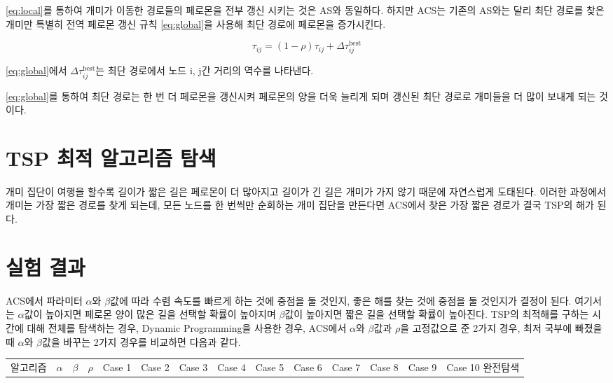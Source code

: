 \documentclass{kcc}
\begin{document}
\eqref{eq:local}를 통하여 개미가 이동한 경로들의 페로몬을 전부 갱신 시키는 것은 AS와 동일하다. 
하지만 ACS는 기존의 AS와는 달리 최단 경로를 찾은 개미만 특별히 전역 페로몬 갱신 규칙 \eqref{eq:global}을 사용해 최단 경로에 페로몬을 증가시킨다.

\begin{equation} \label{eq:global} \tag{3}
	\tau_{ij} = (1 - \rho) \tau_{ij} + \Delta \tau_{ij}^{\text{best}}
\end{equation}

\eqref{eq:global}에서  $\Delta \tau_{ij}^{\text{best}}$는 최단 경로에서 노드 i, j간 거리의 역수를 나타낸다.

\eqref{eq:global}를 통하여 최단 경로는 한 번 더 페로몬을 갱신시켜 페로몬의 양을 더욱 늘리게 되며 갱신된 최단 경로로 개미들을 더 많이 보내게 되는 것이다.

\section{TSP 최적 알고리즘 탐색}
 개미 집단이 여행을 할수록 길이가 짧은 길은 페로몬이 더 많아지고 길이가 긴 길은 개미가 가지 않기 때문에 자연스럽게 도태된다. 이러한 과정에서 개미는 가장 짧은 경로를 찾게 되는데, 모든 노드를 한 번씩만 순회하는 개미 집단을 만든다면 ACS에서 찾은 가장 짧은 경로가 결국 TSP의 해가 된다.

\section{실험 결과}

 ACS에서 파라미터 $\alpha$와 $\beta$값에 따라 수렴 속도를 빠르게 하는 것에 중점을 둘 것인지, 좋은 해를 찾는 것에 중점을 둘 것인지가 결정이 된다. 여기서는 $\alpha$값이 높아지면 페로몬 양이 많은 길을 선택할 확률이 높아지며 $\beta$값이 높아지면 짧은 길을 선택할 확률이 높아진다. TSP의 최적해를 구하는 시간에 대해 전체를 탐색하는 경우, Dynamic Programming을 사용한 경우, ACS에서 $\alpha$와 $\beta$값과 $\rho$을 고정값으로 준 2가지 경우, 최저 국부에 빠졌을 때 $\alpha$와 $\beta$값을 바꾸는 2가지 경우를 비교하면 다음과 같다.
 
 \begin{table}[H]
 \begin{center}
 \begin{tabular}{c|c|c|c||c|c|c|c|c|c|c|c|c|c}
 알고리즘 & $\alpha$ & $\beta$ & $\rho$ & Case 1 & Case 2 & Case 3 & Case 4 & Case 5 & Case 6 & Case 7 & Case 8 & Case 9 & Case 10
 완전탐색 & 
 \end{tabular}
 \end{center}
 \end{table}
 
\end{document}
